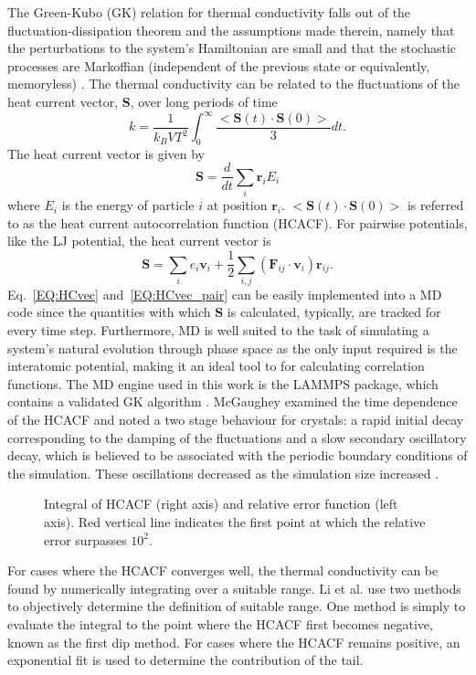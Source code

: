 The Green-Kubo (GK) relation for thermal conductivity falls out of the fluctuation-dissipation theorem and the assumptions made therein, namely that the perturbations to the system's Hamiltonian are small and that the stochastic processes are Markoffian (independent of the previous state or equivalently, memoryless) \cite{green:398}. The thermal conductivity can be related to the fluctuations of the heat current vector, $\bm{S}$, over long periods of time
%
\begin{equation}\label{EQ:intHCACF}
k=\frac{1}{k_B V T^2}\int_0^{\infty}\frac{<\bm{S}(t)\cdot\bm{S}(0)>}{3}dt.
\end{equation}
%
The heat current vector is given by 
%
\begin{equation}\label{EQ:HCvec}
\bm{S}=\frac{d}{dt}\sum_i\bm{r}_iE_i
\end{equation}
%
where $E_i$ is the energy of particle $i$ at position $\bm{r}_i$. $<\bm{S}(t)\cdot\bm{S}(0)>$ is referred to as the heat current autocorrelation function (HCACF). For pairwise potentials, like the LJ potential, the heat current vector is
%
\begin{equation}\label{EQ:HCvec_pair}
\bm{S}=\sum_ie_i\bm{v}_i+\frac{1}{2}\sum_{i,j}(\bm{F}_{ij}\cdot\bm{v}_{i})\bm{r}_{ij}.
\end{equation}
%
Eq.~\ref{EQ:HCvec} and~\ref{EQ:HCvec_pair} can be easily implemented into a MD code since the quantities with which $\bm{S}$ is calculated, typically, are tracked for every time step. Furthermore, MD is well suited to the task of simulating a system's natural evolution through phase space as the only input required is the interatomic potential, making it an ideal tool to for calculating correlation functions. The MD engine used in this work is  the LAMMPS package, which contains a validated GK algorithm \cite{LAMMPS}. McGaughey examined the time dependence of the HCACF and noted a two stage behaviour for crystals: a rapid initial decay corresponding to the damping of the fluctuations and a slow secondary oscillatory decay, which is believed to be associated with the periodic boundary conditions of the simulation. These oscillations decreased as the simulation size increased \cite{mcgaugheythesis}.
%
\begin{figure}
\begin{center}
\renewcommand{\figure}{Fig.}
\caption{Integral of HCACF (right axis) and relative error function (left axis). Red vertical line indicates the first point at which the relative error surpasses $10^2$.}
\label{FIG:GK_bulk}
\end{center}
\end{figure}
%
For cases where the HCACF converges well, the thermal conductivity can be found by numerically integrating over a suitable range. Li et al. \cite{Li1998139} use two methods to objectively determine the definition of suitable range. One method is simply to evaluate the integral to the point where the HCACF first becomes negative, known as the first dip method. For cases where the HCACF remains positive, an exponential fit is used to determine the contribution of the tail.

